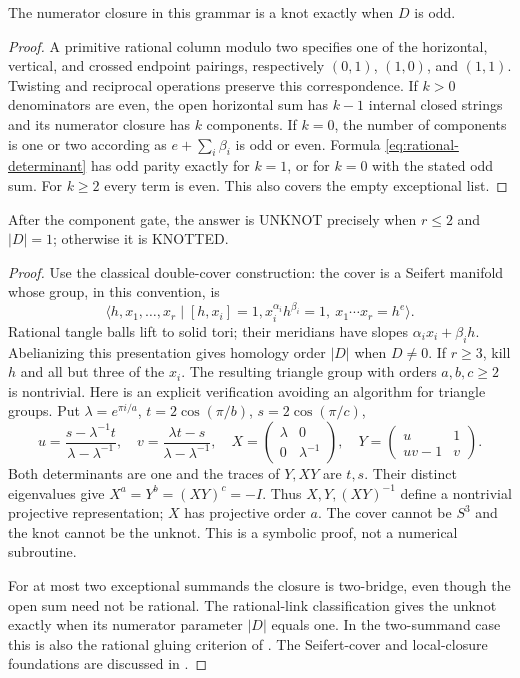 \begin{lemma}
The numerator closure in this grammar is a knot exactly when $D$ is odd.
\end{lemma}
\begin{proof}
A primitive rational column modulo two specifies one of the horizontal,
vertical, and crossed endpoint pairings, respectively $(0,1)$, $(1,0)$,
and $(1,1)$.  Twisting and reciprocal operations preserve this correspondence.
If $k>0$ denominators are even, the open horizontal sum has $k-1$ internal
closed strings and its numerator closure has $k$ components.  If $k=0$,
the number of components is one or two according as
$e+\sum_i\beta_i$ is odd or even.  Formula
\eqref{eq:rational-determinant} has odd parity exactly for $k=1$, or for
$k=0$ with the stated odd sum.  For $k\ge2$ every term is even.
This also covers the empty exceptional list.
\end{proof}

\begin{proposition}
After the component gate, the answer is UNKNOT precisely when
$r\le2$ and $|D|=1$; otherwise it is KNOTTED.
\end{proposition}
\begin{proof}
Use the classical double-cover construction: the cover is a Seifert
manifold whose group, in this convention, is
\[
 \langle h,x_1,\ldots,x_r\mid [h,x_i]=1,
 x_i^{\alpha_i}h^{\beta_i}=1,\ x_1\cdots x_r=h^e\rangle.
\]
Rational tangle balls lift to solid tori; their meridians have slopes
$\alpha_i x_i+\beta_i h$.  Abelianizing this presentation gives homology
order $|D|$ when $D\ne0$.  If $r\ge3$, kill $h$ and all but three of the
$x_i$.  The resulting triangle group with orders $a,b,c\ge2$ is nontrivial.
Here is an explicit verification avoiding an algorithm for triangle groups.
Put $\lambda=e^{\pi i/a}$, $t=2\cos(\pi/b)$, $s=2\cos(\pi/c)$,
\[
 u=\frac{s-\lambda^{-1}t}{\lambda-\lambda^{-1}},\quad
 v=\frac{\lambda t-s}{\lambda-\lambda^{-1}},\quad
 X=\begin{pmatrix}\lambda&0\\0&\lambda^{-1}\end{pmatrix},\quad
 Y=\begin{pmatrix}u&1\\uv-1&v\end{pmatrix}.
\]
Both determinants are one and the traces of $Y,XY$ are $t,s$.
Their distinct eigenvalues give $X^a=Y^b=(XY)^c=-I$.
Thus $X,Y,(XY)^{-1}$ define a nontrivial projective representation;
$X$ has projective order $a$.  The cover cannot be $S^3$ and the knot
cannot be the unknot.  This is a symbolic proof, not a numerical subroutine.

For at most two exceptional summands the closure is two-bridge, even though
the open sum need not be rational.  The rational-link classification gives
the unknot exactly when its numerator parameter $|D|$ equals one.
In the two-summand case this is also the rational gluing criterion of
\cite[Theorem 5]{rational-hard}.  The Seifert-cover and local-closure
foundations are discussed in \cite[Theorem 4.9]{rational-local}.
\end{proof}

